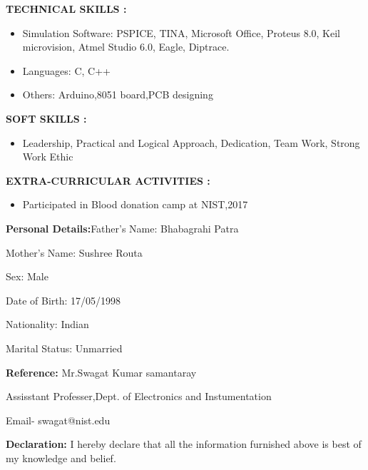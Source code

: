 \documentclass[a4]{article}
\begin{document}
\vspace{3mm}
\textbf{TECHNICAL SKILLS : } 
\begin{itemize}
	\item Simulation Software: PSPICE, TINA, Microsoft Office, Proteus 8.0, Keil microvision, Atmel Studio 6.0, Eagle, Diptrace.
	\item Languages: C, C++
        \item Others: Arduino,8051 board,PCB designing

\end{itemize}

\vspace{3mm}
\textbf{SOFT SKILLS : } 
\begin{itemize}
	\item  Leadership,  Practical  and Logical Approach, Dedication, Team Work, Strong Work Ethic

\end{itemize}

\vspace{3mm}
\textbf{EXTRA-CURRICULAR ACTIVITIES : } 
\begin{itemize}
	\item Participated in Blood donation camp at NIST,2017
\end{itemize}

\vspace{3mm}
\textbf{Personal Details:}\hspace{.4cm}Father's Name: Bhabagrahi Patra

\hspace{3.4cm}Mother's Name: Sushree Routa

\hspace{3.4cm}Sex: Male

\hspace{3.4cm}Date of Birth: 17/05/1998

\hspace{3.4cm}Nationality: Indian

\hspace{3.4cm}Marital Status: Unmarried

\vspace{3mm}
\textbf{Reference: }
\hspace{1cm} Mr.Swagat Kumar samantaray

\hspace{3.4cm}Assisstant Professer,Dept. of Electronics and Instumentation

\hspace{3.4cm}Email- swagat@nist.edu

\vspace{3mm}
\textbf{Declaration: }I hereby declare that all the information furnished above is best of my knowledge and belief.
\end{document}
